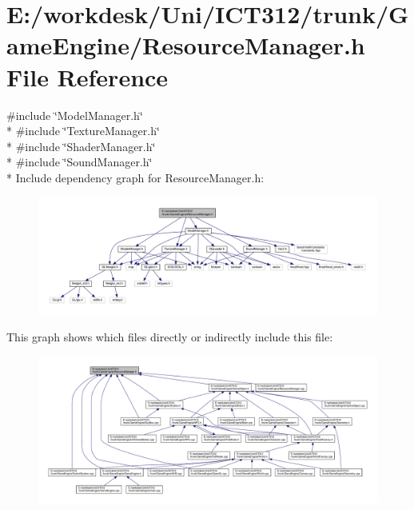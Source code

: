 \section{E\+:/workdesk/\+Uni/\+I\+C\+T312/trunk/\+Game\+Engine/\+Resource\+Manager.h File Reference}
\label{_resource_manager_8h}
{\ttfamily \#include \char`\"{}Model\+Manager.\+h\char`\"{}}\\*
{\ttfamily \#include \char`\"{}Texture\+Manager.\+h\char`\"{}}\\*
{\ttfamily \#include \char`\"{}Shader\+Manager.\+h\char`\"{}}\\*
{\ttfamily \#include \char`\"{}Sound\+Manager.\+h\char`\"{}}\\*
Include dependency graph for Resource\+Manager.\+h\+:\nopagebreak
\begin{figure}[H]
\begin{center}
\leavevmode
\includegraphics[width=350pt]{d5/de6/_resource_manager_8h__incl}
\end{center}
\end{figure}
This graph shows which files directly or indirectly include this file\+:
\nopagebreak
\begin{figure}[H]
\begin{center}
\leavevmode
\includegraphics[width=350pt]{dd/d98/_resource_manager_8h__dep__incl}
\end{center}
\end{figure}
